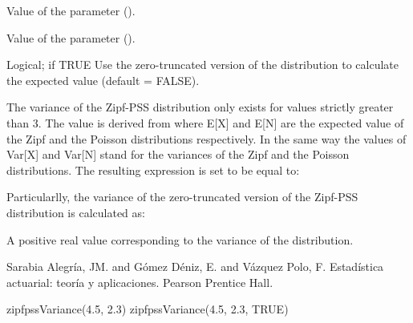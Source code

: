 \documentclass[letterpaper]{book}
\begin{document}
%
\begin{Arguments}
\begin{ldescription}
\item[\code{alpha}] Value of the \eqn{\alpha}{} parameter ().

\item[\code{lambda}] Value of the \eqn{\lambda}{} parameter ().

\item[\code{isTruncated}] Logical; if TRUE Use the zero-truncated version of the distribution to calculate the expected value (default = FALSE).
\end{ldescription}
\end{Arguments}
%
\begin{Details}\relax
The variance of the Zipf-PSS distribution only exists for \eqn{\alpha}{} values strictly greater than 3.
The value is derived from  where E[X] and
E[N] are the expected value of the Zipf and the Poisson distributions respectively.
In the same way the values of Var[X] and Var[N] stand for the variances of the Zipf and
the Poisson distributions. The resulting expression is set to be equal to:

Particularlly, the variance of the zero-truncated version of the Zipf-PSS distribution is
calculated as:
\end{Details}
%
\begin{Value}
A positive real value corresponding to the variance of the distribution.
\end{Value}
%
\begin{References}\relax

Sarabia Alegría, JM. and Gómez Déniz, E. and Vázquez Polo, F. Estadística actuarial: teoría y aplicaciones. Pearson Prentice Hall.

\end{References}
%
\begin{Examples}
\begin{ExampleCode}
zipfpssVariance(4.5, 2.3)
zipfpssVariance(4.5, 2.3, TRUE)
\end{ExampleCode}
\end{Examples}
\printindex{}
\end{document}

